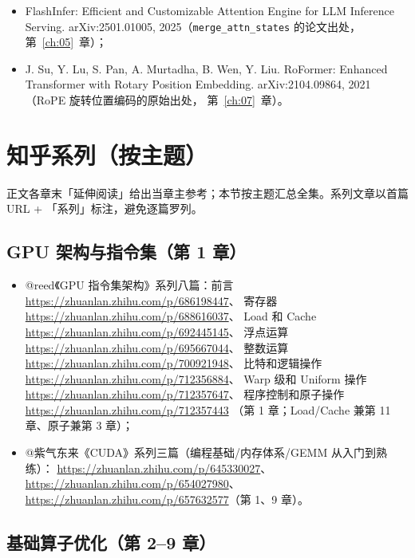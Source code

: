 \begin{itemize}
        Scaling. arXiv:2603.05451, 2026（lazy rescale / conditional
        rescaling 的原始出处，第~\ref{ch:27}、\ref{ch:29}、\ref{ch:32}~章）；
  \item FlashInfer: Efficient and Customizable Attention Engine for LLM
        Inference Serving. arXiv:2501.01005, 2025（\texttt{merge\_\allowbreak{}attn\_\allowbreak{}states}
        的论文出处，第~\ref{ch:05}~章）；
  \item J. Su, Y. Lu, S. Pan, A. Murtadha, B. Wen, Y. Liu. RoFormer:
        Enhanced Transformer with Rotary Position Embedding.
        arXiv:2104.09864, 2021（RoPE 旋转位置编码的原始出处，
        第~\ref{ch:07}~章）。
\end{itemize}

\section{知乎系列（按主题）}

正文各章末「延伸阅读」给出当章主参考；本节按主题汇总全集。系列文章以首篇
URL + 「系列」标注，避免逐篇罗列。

\subsection{GPU 架构与指令集（第 1 章）}

\begin{itemize}
  \item @reed《GPU 指令集架构》系列八篇：前言 \url{https://zhuanlan.zhihu.com/p/686198447}、
        寄存器 \url{https://zhuanlan.zhihu.com/p/688616037}、
        Load 和 Cache \url{https://zhuanlan.zhihu.com/p/692445145}、
        浮点运算 \url{https://zhuanlan.zhihu.com/p/695667044}、
        整数运算 \url{https://zhuanlan.zhihu.com/p/700921948}、
        比特和逻辑操作 \url{https://zhuanlan.zhihu.com/p/712356884}、
        Warp 级和 Uniform 操作 \url{https://zhuanlan.zhihu.com/p/712357647}、
        程序控制和原子操作 \url{https://zhuanlan.zhihu.com/p/712357443}
        （第 1 章；Load/Cache 兼第 11 章、原子兼第 3 章）；
  \item @紫气东来《CUDA》系列三篇（编程基础/内存体系/GEMM 从入门到熟练）：
        \url{https://zhuanlan.zhihu.com/p/645330027}、
        \url{https://zhuanlan.zhihu.com/p/654027980}、
        \url{https://zhuanlan.zhihu.com/p/657632577}（第 1、9 章）。
\end{itemize}

\subsection{基础算子优化（第 2--9 章）}

